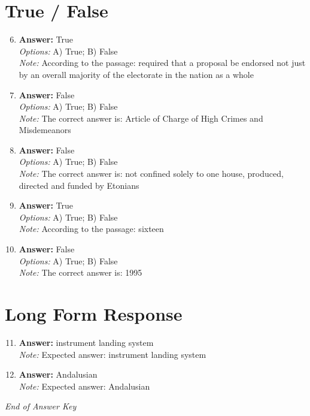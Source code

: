 \documentclass[12pt]{article}
\begin{document}
\section*{True / False}
\begin{enumerate}[label=\arabic*.]
\setcounter{enumi}{5}
\item \textbf{Answer:} True
\\ \textit{Options:} A) True; B) False
\\ \textit{Note:} According to the passage: required that a proposal be endorsed not just by an overall majority of the electorate in the nation as a whole
\item \textbf{Answer:} False
\\ \textit{Options:} A) True; B) False
\\ \textit{Note:} The correct answer is: Article of Charge of High Crimes and Misdemeanors
\item \textbf{Answer:} False
\\ \textit{Options:} A) True; B) False
\\ \textit{Note:} The correct answer is: not confined solely to one house, produced, directed and funded by Etonians
\item \textbf{Answer:} True
\\ \textit{Options:} A) True; B) False
\\ \textit{Note:} According to the passage: sixteen
\item \textbf{Answer:} False
\\ \textit{Options:} A) True; B) False
\\ \textit{Note:} The correct answer is: 1995
\end{enumerate}

\section*{Long Form Response}
\begin{enumerate}[label=\arabic*.]
\setcounter{enumi}{10}
\item \textbf{Answer:} instrument landing system
\\ \textit{Note:} Expected answer: instrument landing system
\item \textbf{Answer:} Andalusian
\\ \textit{Note:} Expected answer: Andalusian
\end{enumerate}

\vfill
\noindent\textit{End of Answer Key}
\end{document}
